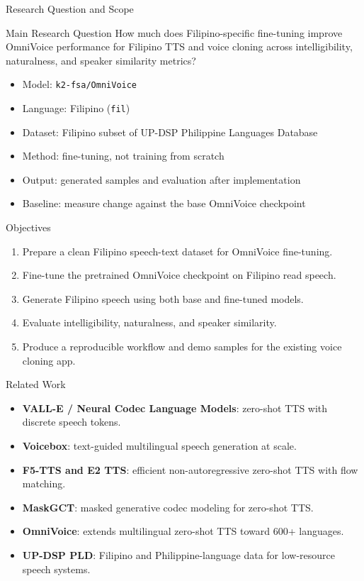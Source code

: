 \documentclass[aspectratio=169]{beamer}
\begin{document}
\begin{frame}{Research Question and Scope}
  \begin{block}{Main Research Question}
    How much does Filipino-specific fine-tuning improve OmniVoice performance for Filipino TTS and voice cloning across intelligibility, naturalness, and speaker similarity metrics?
  \end{block}

  \vspace{0.5em}

  \begin{itemize}
    \item Model: \texttt{k2-fsa/OmniVoice}
    \item Language: Filipino (\texttt{fil})
    \item Dataset: Filipino subset of UP-DSP Philippine Languages Database
    \item Method: fine-tuning, not training from scratch
    \item Output: generated samples and evaluation after implementation
    \item Baseline: measure change against the base OmniVoice checkpoint
  \end{itemize}
\end{frame}

\begin{frame}{Objectives}
  \begin{enumerate}
    \item Prepare a clean Filipino speech-text dataset for OmniVoice fine-tuning.
    \item Fine-tune the pretrained OmniVoice checkpoint on Filipino read speech.
    \item Generate Filipino speech using both base and fine-tuned models.
    \item Evaluate intelligibility, naturalness, and speaker similarity.
    \item Produce a reproducible workflow and demo samples for the existing voice cloning app.
  \end{enumerate}
\end{frame}

\begin{frame}{Related Work}
  \begin{itemize}
    \item \textbf{VALL-E / Neural Codec Language Models}: zero-shot TTS with discrete speech tokens.
    \item \textbf{Voicebox}: text-guided multilingual speech generation at scale.
    \item \textbf{F5-TTS and E2 TTS}: efficient non-autoregressive zero-shot TTS with flow matching.
    \item \textbf{MaskGCT}: masked generative codec modeling for zero-shot TTS.
    \item \textbf{OmniVoice}: extends multilingual zero-shot TTS toward 600+ languages.
    \item \textbf{UP-DSP PLD}: Filipino and Philippine-language data for low-resource speech systems.
  \end{itemize}
\end{frame}
\end{document}
